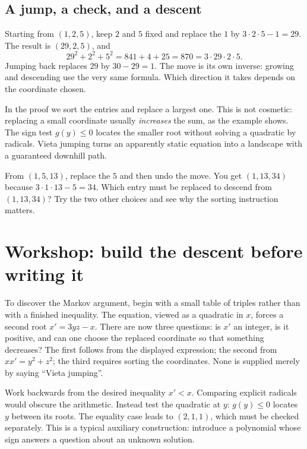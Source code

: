 \subsection*{A jump, a check, and a descent}
Starting from $(1,2,5)$, keep $2$ and $5$ fixed and replace the $1$ by $3\cdot2\cdot5-1=29$. The result is $(29,2,5)$, and
\[
29^2+2^2+5^2=841+4+25=870=3\cdot29\cdot2\cdot5.
\]
Jumping back replaces $29$ by $30-29=1$. The move is its own inverse: growing and descending use the very same formula. Which direction it takes depends on the coordinate chosen.

In the proof we sort the entries and replace a largest one. This is not cosmetic: replacing a small coordinate usually \emph{increases} the sum, as the example shows. The sign test $g(y)\le0$ locates the smaller root without solving a quadratic by radicals. Vieta jumping turns an apparently static equation into a landscape with a guaranteed downhill path.

\begin{think}
From $(1,5,13)$, replace the $5$ and then undo the move. You get $(1,13,34)$ because $3\cdot1\cdot13-5=34$. Which entry must be replaced to descend from $(1,13,34)$? Try the two other choices and see why the sorting instruction matters.
\end{think}

\section{Workshop: build the descent before writing it}

To discover the Markov argument, begin with a small table of triples rather
than with a finished inequality. The equation, viewed as a quadratic in $x$,
forces a second root $x'=3yz-x$. There are now three questions: is $x'$
an integer, is it positive, and can one choose the replaced coordinate so
that something decreases? The first follows from the displayed expression;
the second from $xx'=y^2+z^2$; the third requires sorting the coordinates.
None is supplied merely by saying ``Vieta jumping''.

Work backwards from the desired inequality $x'<x$. Comparing explicit
radicals would obscure the arithmetic. Instead test the quadratic at $y$:
$g(y)\le0$ locates $y$ between its roots. The equality case leads to
$(2,1,1)$, which must be checked separately. This is a typical auxiliary
construction: introduce a polynomial whose sign answers a question about
an unknown solution.

